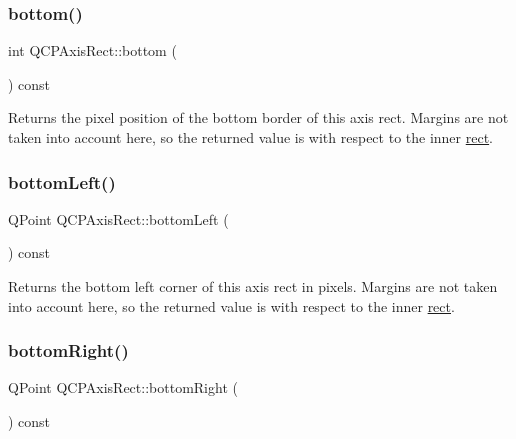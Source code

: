 \mbox{\label{class_q_c_p_axis_rect_acefdf1abaa8a8ab681e906cc2be9581e}} 
\subsubsection{\texorpdfstring{bottom()}{bottom()}}
{\footnotesize\ttfamily int Q\+C\+P\+Axis\+Rect\+::bottom (\begin{DoxyParamCaption}{ }\end{DoxyParamCaption}) const\hspace{0.3cm}{\ttfamily [inline]}}

Returns the pixel position of the bottom border of this axis rect. Margins are not taken into account here, so the returned value is with respect to the inner \mbox{\hyperlink{class_q_c_p_layout_element_a208effccfe2cca4a0eaf9393e60f2dd4}{rect}}. \mbox{\label{class_q_c_p_axis_rect_ab15d4311d6535ccd7af504dc0e2b98c6}} 
\subsubsection{\texorpdfstring{bottomLeft()}{bottomLeft()}}
{\footnotesize\ttfamily Q\+Point Q\+C\+P\+Axis\+Rect\+::bottom\+Left (\begin{DoxyParamCaption}{ }\end{DoxyParamCaption}) const\hspace{0.3cm}{\ttfamily [inline]}}

Returns the bottom left corner of this axis rect in pixels. Margins are not taken into account here, so the returned value is with respect to the inner \mbox{\hyperlink{class_q_c_p_layout_element_a208effccfe2cca4a0eaf9393e60f2dd4}{rect}}. \mbox{\label{class_q_c_p_axis_rect_a36dac884ec8fa3a3a2f3842ca7b7d32d}} 
\subsubsection{\texorpdfstring{bottomRight()}{bottomRight()}}
{\footnotesize\ttfamily Q\+Point Q\+C\+P\+Axis\+Rect\+::bottom\+Right (\begin{DoxyParamCaption}{ }\end{DoxyParamCaption}) const\hspace{0.3cm}{\ttfamily [inline]}}

